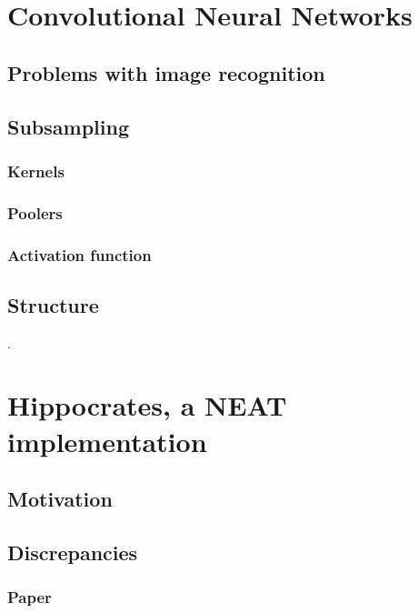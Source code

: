 \documentclass[11pt]{article}
\begin{document}
	\section{Convolutional Neural Networks}
		\subsection{Problems with image recognition}
			
		\subsection{Subsampling}
			
			\subsubsection{Kernels}
			
			\subsubsection{Poolers}
			
			\subsubsection{Activation function}
			
		\subsection{Structure}
			.
	\newpage

	\section{Hippocrates, a NEAT implementation}
		\subsection{Motivation}
			
		\subsection{Discrepancies}
			\subsubsection{Paper}
				
\end{document}

